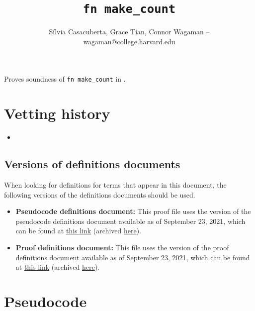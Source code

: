 \documentclass{article}
\title{\texttt{fn make\_count}}
\author{S\'ilvia Casacuberta, Grace Tian, Connor Wagaman -- wagaman@college.harvard.edu}
\date{}
\begin{document}
\maketitle

\contrib
Proves soundness of \texttt{fn make\_count} in .

\section{Vetting history}
\begin{itemize}
    \item {}
\end{itemize}

\subsection{Versions of definitions documents}
\label{sec:versioned-docs}

When looking for definitions for terms that appear in this document, the following versions of the definitions documents should be used.

\begin{itemize}
    \item \textbf{Pseudocode definitions document:} This proof file uses the version of the pseudocode definitions document available as of September 23, 2021, which can be found at \href{https://github.com/opendp/whitepapers/blob/pseudocode-defns/pseudocode-defns/pseudocode_defns.pdf}{this link} (archived \href{https://web.archive.org/web/20210906201546/https://raw.githubusercontent.com/opendp/whitepapers/pseudocode-defns/pseudocode-defns/pseudocode_defns.pdf}{here}).
    
    \item \textbf{Proof definitions document:} This file uses the version of the proof definitions document available as of September 23, 2021, which can be found at \href{https://github.com/opendp/whitepapers/blob/proof-defns/proof-defns/proof_defns.pdf}{this link} (archived \href{https://web.archive.org/web/20210906201056/https://raw.githubusercontent.com/opendp/whitepapers/proof-defns/proof-defns/proof_defns.pdf}{here}). 
\end{itemize}

\section{Pseudocode}

\label{sec:pseudocode}
\end{document}
